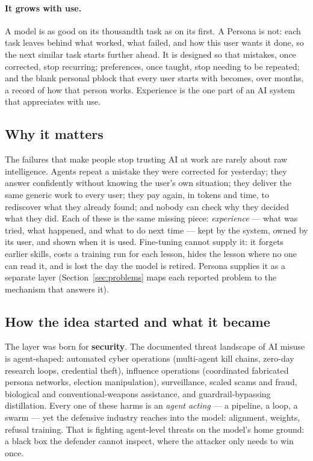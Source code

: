 \documentclass[11pt]{article}
\begin{document}
\paragraph{It grows with use.} A model is as good on its thousandth task as on its first. A Persona is not: each task leaves behind what worked, what failed, and how this user wants it done, so the next similar task starts further ahead. It is designed so that mistakes, once corrected, stop recurring; preferences, once taught, stop needing to be repeated; and the blank personal pblock that every user starts with becomes, over months, a record of how that person works. Experience is the one part of an AI system that appreciates with use.

\subsection{Why it matters}
\label{sec:why}
The failures that make people stop trusting AI at work are rarely about raw intelligence. Agents repeat a mistake they were corrected for yesterday; they answer confidently without knowing the user's own situation; they deliver the same generic work to every user; they pay again, in tokens and time, to rediscover what they already found; and nobody can check why they decided what they did. Each of these is the same missing piece: \emph{experience} --- what was tried, what happened, and what to do next time --- kept by the system, owned by its user, and shown when it is used. Fine-tuning cannot supply it: it forgets earlier skills, costs a training run for each lesson, hides the lesson where no one can read it, and is lost the day the model is retired. Persona supplies it as a separate layer (Section~\ref{sec:problems} maps each reported problem to the mechanism that answers it).

\subsection{How the idea started and what it became}
\label{sec:history}

The layer was born for \textbf{security}. The documented threat landscape of AI misuse is agent-shaped: automated cyber operations (multi-agent kill chains, zero-day research loops, credential theft), influence operations (coordinated fabricated persona networks, election manipulation), surveillance, scaled scams and fraud, biological and conventional-weapons assistance, and guardrail-bypassing distillation. Every one of these harms is an \emph{agent acting} --- a pipeline, a loop, a swarm --- yet the defensive industry reaches into the model: alignment, weights, refusal training. That is fighting agent-level threats on the model's home ground: a black box the defender cannot inspect, where the attacker only needs to win once.
\end{document}
